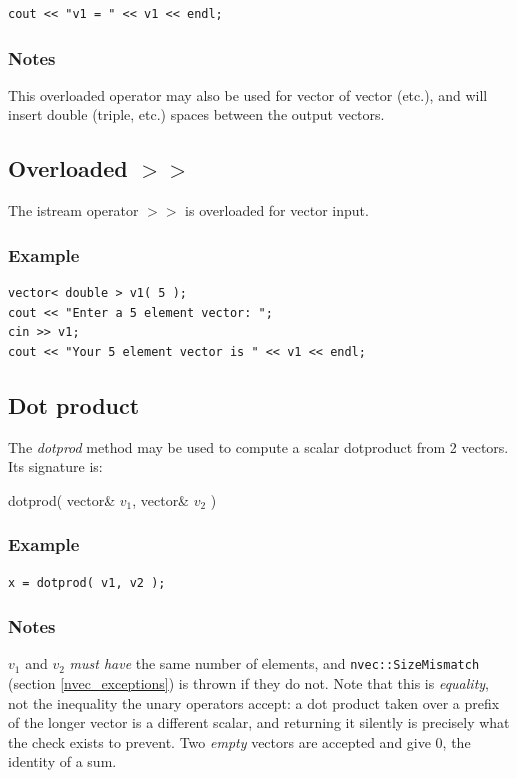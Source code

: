 \documentclass{report}
\begin{document}
\begin{verbatim}
cout << "v1 = " << v1 << endl;
\end{verbatim}

\subsubsection{Notes}

This overloaded operator may also be used for vector of vector (etc.),
and will insert double (triple, etc.) spaces between the output
vectors.

\subsection{Overloaded $>>$}

The istream operator $>>$ is overloaded for vector input.

\subsubsection{Example}

\begin{verbatim}
vector< double > v1( 5 );
cout << "Enter a 5 element vector: ";
cin >> v1;
cout << "Your 5 element vector is " << v1 << endl;
\end{verbatim}

\subsection{Dot product}

The {\em dotprod} method may be used to compute a scalar dotproduct
from 2 vectors.  Its signature is:

dotprod( vector\& $v_1$, vector\& $v_2$ )

\subsubsection{Example}

\begin{verbatim}
x = dotprod( v1, v2 );
\end{verbatim}

\subsubsection{Notes}
$v_1$ and $v_2$ {\em must have} the same number of elements, and
\texttt{nvec::SizeMismatch} (section \ref{nvec_exceptions}) is thrown
if they do not.  Note that this is {\em equality}, not the inequality
the unary operators accept: a dot product taken over a prefix of the
longer vector is a different scalar, and returning it silently is
precisely what the check exists to prevent.  Two {\em empty} vectors
are accepted and give 0, the identity of a sum.
\end{document}
